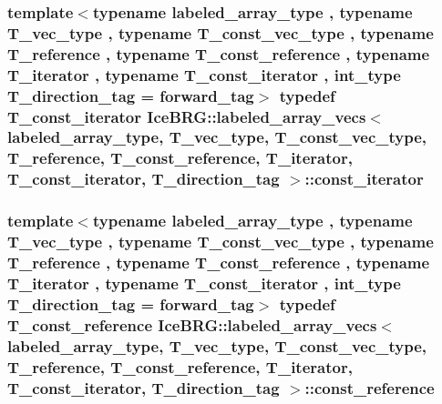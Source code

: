 \subsubsection[{const\+\_\+iterator}]{\setlength{\rightskip}{0pt plus 5cm}template$<$typename labeled\+\_\+array\+\_\+type , typename T\+\_\+vec\+\_\+type , typename T\+\_\+const\+\_\+vec\+\_\+type , typename T\+\_\+reference , typename T\+\_\+const\+\_\+reference , typename T\+\_\+iterator , typename T\+\_\+const\+\_\+iterator , int\+\_\+type T\+\_\+direction\+\_\+tag = forward\+\_\+tag$>$ typedef T\+\_\+const\+\_\+iterator {\bf Ice\+B\+R\+G\+::labeled\+\_\+array\+\_\+vecs}$<$ labeled\+\_\+array\+\_\+type, T\+\_\+vec\+\_\+type, T\+\_\+const\+\_\+vec\+\_\+type, T\+\_\+reference, T\+\_\+const\+\_\+reference, T\+\_\+iterator, T\+\_\+const\+\_\+iterator, T\+\_\+direction\+\_\+tag $>$\+::{\bf const\+\_\+iterator}}\label{classIceBRG_1_1labeled__array__vecs_a6003abed56d6f931ce74524cda329972}
\hypertarget{classIceBRG_1_1labeled__array__vecs_a5ab1d23d61a03d4f64756b59f5773d41}{}
\subsubsection[{const\+\_\+reference}]{\setlength{\rightskip}{0pt plus 5cm}template$<$typename labeled\+\_\+array\+\_\+type , typename T\+\_\+vec\+\_\+type , typename T\+\_\+const\+\_\+vec\+\_\+type , typename T\+\_\+reference , typename T\+\_\+const\+\_\+reference , typename T\+\_\+iterator , typename T\+\_\+const\+\_\+iterator , int\+\_\+type T\+\_\+direction\+\_\+tag = forward\+\_\+tag$>$ typedef T\+\_\+const\+\_\+reference {\bf Ice\+B\+R\+G\+::labeled\+\_\+array\+\_\+vecs}$<$ labeled\+\_\+array\+\_\+type, T\+\_\+vec\+\_\+type, T\+\_\+const\+\_\+vec\+\_\+type, T\+\_\+reference, T\+\_\+const\+\_\+reference, T\+\_\+iterator, T\+\_\+const\+\_\+iterator, T\+\_\+direction\+\_\+tag $>$\+::{\bf const\+\_\+reference}}\label{classIceBRG_1_1labeled__array__vecs_a5ab1d23d61a03d4f64756b59f5773d41}
\hypertarget{classIceBRG_1_1labeled__array__vecs_aefecf82bcd5d24b2c6fc29b4f8930054}{}
